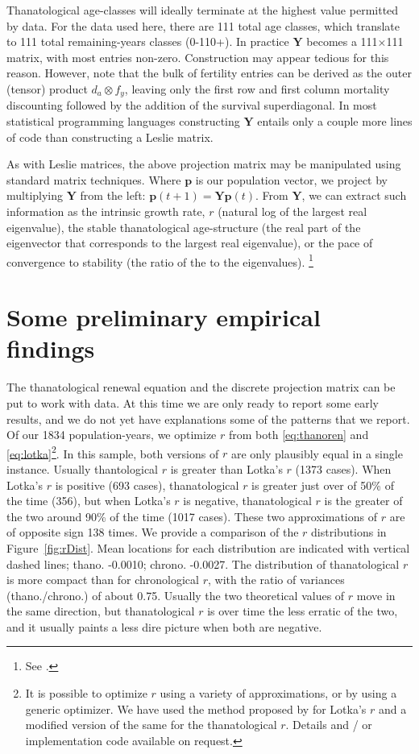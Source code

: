 \documentclass{article}
\begin{document}
Thanatological age-classes will ideally terminate at the highest value permitted
by data. For the data used here, there are 111 total age classes, which
translate to 111 total remaining-years classes (0-110+). In practice $\textbf{Y}$ becomes
a 111$\times$111 matrix, with most entries non-zero. Construction may appear
tedious for this reason. However, note that the bulk of fertility entries can
be derived as the outer (tensor) product $d_a \otimes f_y$, leaving only the 
first row and first column mortality discounting followed by the addition of the
survival superdiagonal. In most statistical programming languages constructing $\textbf{Y}$ entails only
a couple more lines of code than constructing a Leslie matrix.

As with Leslie matrices, the above projection matrix may be manipulated using
standard matrix techniques. Where $\textbf{p}$ is our population vector, we
project by multiplying $\textbf{Y}$ from the left: $\textbf{p}(t + 1) =
\textbf{Y}\textbf{p}(t)$. From $\textbf{Y}$, we can extract such information as 
the intrinsic growth rate, $r$ (natural log of the largest
real eigenvalue), the stable thanatological age-structure (the real part of the
eigenvector that corresponds to the largest real eigenvalue), or the pace of
convergence to stability (the ratio of the  to the  eigenvalues).
\footnote{See \citet[p.86-87]{caswell2001matrix}.}

\section*{Some preliminary empirical findings}
The thanatological renewal equation and the discrete projection matrix can be
put to work with data. At this time we are only ready to report some early
results, and we do not yet have explanations some of the patterns that we
report. Of our 1834 population-years, we optimize $r$ from both
\eqref{eq:thanoren} and \eqref{eq:lotka}\footnote{It is possible to optimize $r$ using a variety of approximations, or by using a generic optimizer. We have used the method proposed by \citet{coale1957new} for Lotka's $r$ and a modified version of the same for
the thanatological $r$. Details and / or implementation code available on
request.}. In this sample, both versions of $r$ are only plausibly equal in a
single instance. Usually thantological $r$ is greater than Lotka's $r$ (1373
cases). When Lotka's $r$ is positive (693 cases), thanatological $r$ is greater
just over of 50\% of the time (356), but when Lotka's $r$ is negative,
thanatological $r$ is the greater of the two around 90\% of the time (1017
cases). These two approximations of $r$ are of opposite sign 138 times. We
provide a comparison of the $r$ distributions in Figure~\ref{fig:rDist}. Mean
locations for each distribution are indicated with vertical dashed lines; thano.
-0.0010; chrono. -0.0027. The distribution of thanatological $r$ is more compact
than for chronological $r$, with the ratio of variances (thano./chrono.) of
about 0.75. Usually the two theoretical values of $r$ move in the same direction, but thanatological $r$
is over time the less erratic of the two, and it usually paints a less dire picture when both are negative.
\end{document}
